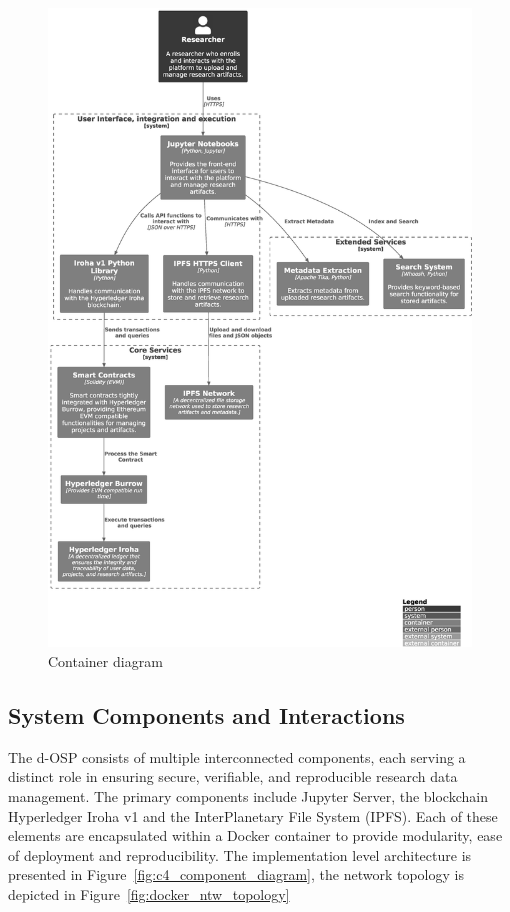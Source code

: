 \documentclass[final]{rc-book-2.14}
\begin{document}
\begin{figure}[htbp]
    \centering
    \includegraphics[scale=0.3]{fig/c4_container_diagram.eps}
    \caption{Container diagram}
    \label{fig:c4_container_diagram}
\end{figure}


\subsection{System Components and Interactions}

The d-OSP consists of multiple interconnected components, each serving a distinct role in ensuring secure, verifiable, and reproducible research data management. The primary components include Jupyter Server, the blockchain Hyperledger Iroha v1 and the InterPlanetary File System (IPFS). Each of these elements are encapsulated within a Docker container to provide modularity, ease of deployment and reproducibility. The implementation level architecture is presented in Figure~\ref{fig:c4_component_diagram}, the network topology is depicted in Figure~\ref{fig:docker_ntw_topology}
\end{document}
